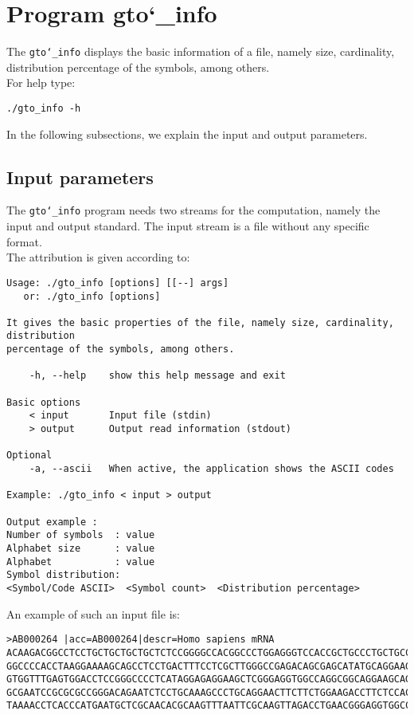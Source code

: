 \section{Program gto\char`_info}
The \texttt{gto\char`_info} displays the basic information of a file, namely size, cardinality, distribution percentage of the symbols, among others.\\
For help type:
\begin{lstlisting}
./gto_info -h
\end{lstlisting}
In the following subsections, we explain the input and output parameters.

\subsection*{Input parameters}

The \texttt{gto\char`_info} program needs two streams for the computation, namely the input and output standard. The input stream is a file without any specific format.\\
The attribution is given according to:
\begin{lstlisting}
Usage: ./gto_info [options] [[--] args]
   or: ./gto_info [options]

It gives the basic properties of the file, namely size, cardinality, distribution 
percentage of the symbols, among others.

    -h, --help    show this help message and exit

Basic options
    < input       Input file (stdin)
    > output      Output read information (stdout)

Optional
    -a, --ascii   When active, the application shows the ASCII codes

Example: ./gto_info < input > output

Output example :
Number of symbols  : value
Alphabet size      : value
Alphabet           : value
Symbol distribution:
<Symbol/Code ASCII>  <Symbol count>  <Distribution percentage>
\end{lstlisting}
An example of such an input file is:
\begin{lstlisting}
>AB000264 |acc=AB000264|descr=Homo sapiens mRNA 
ACAAGACGGCCTCCTGCTGCTGCTGCTCTCCGGGGCCACGGCCCTGGAGGGTCCACCGCTGCCCTGCTGCCATTGTCCCC
GGCCCCACCTAAGGAAAAGCAGCCTCCTGACTTTCCTCGCTTGGGCCGAGACAGCGAGCATATGCAGGAAGCGGCAGGAA
GTGGTTTGAGTGGACCTCCGGGCCCCTCATAGGAGAGGAAGCTCGGGAGGTGGCCAGGCGGCAGGAAGCAGGCCAGTGCC
GCGAATCCGCGCGCCGGGACAGAATCTCCTGCAAAGCCCTGCAGGAACTTCTTCTGGAAGACCTTCTCCACCCCCCCAGC
TAAAACCTCACCCATGAATGCTCGCAACACGCAAGTTTAATTCGCAAGTTAGACCTGAACGGGAGGTGGCCACGCAAGTT
\end{lstlisting}

